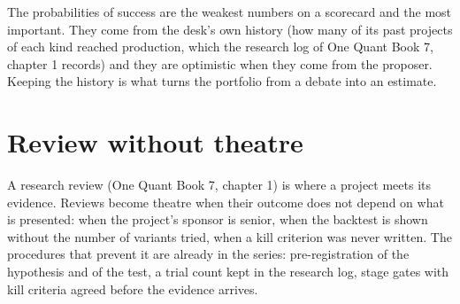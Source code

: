 \begin{omfigure}

\label{fig:fm:managing-researchers-traders-and-engineers:portfolio}
\end{omfigure}

\begin{remark}\label{rem:fm:managing-researchers-traders-and-engineers:inputs}
The probabilities of success are the weakest numbers on a scorecard and the most important. They come from the desk's own history (how many of
its past projects of each kind reached production, which the research log of One Quant Book 7, chapter 1 records) and they are optimistic when
they come from the proposer. Keeping the history is what turns the portfolio from a debate into an estimate.
\end{remark}

\section{Review without theatre}

A research review (One Quant Book 7, chapter 1) is where a project meets its evidence. Reviews become theatre when their outcome does not depend
on what is presented: when the project's sponsor is senior, when the backtest is shown without the number of variants tried, when a kill criterion
was never written. The procedures that prevent it are already in the series: pre-registration of the hypothesis and of the test, a trial count
kept in the research log, stage gates with kill criteria agreed before the evidence arrives.

